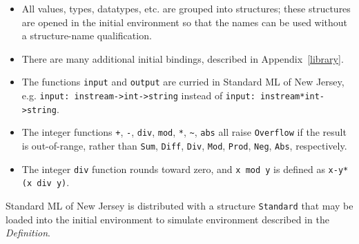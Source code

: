 \begin{itemize}
\item All values, types, datatypes, etc. are grouped into structures;
these structures are opened in the initial environment so that the
names can be used without a structure-name qualification.

\item There are many additional initial bindings, described in 
Appendix~\ref{library}.

\item The functions \verb"input" and \verb"output" are curried in Standard
ML of New Jersey, e.g. \verb"input: instream->int->string" instead of
\verb"input: instream*int->string".

\item The integer functions \verb"+", \verb"-", \verb"div", \verb"mod", 
\verb"*", \verb"~", \verb"abs" all raise \verb"Overflow" if the result is out-of-range,
rather than \verb"Sum", \verb"Diff", \verb"Div", \verb"Mod", \verb"Prod",
\verb"Neg", \verb"Abs", respectively.

\item The integer \verb"div" function rounds toward zero, and \verb"x mod y"
is defined as \verb"x-y*(x div y)".

\end{itemize}

Standard ML of New Jersey is distributed with a structure \verb"Standard"
that may be loaded into the initial environment to simulate
environment described in the {\it Definition}.
